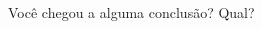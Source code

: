 \documentclass[a4paper,14pt]{article}
\begin{document}
\begin{multicols}{2}
\begin{enumerate}
			Você chegou a alguma conclusão? Qual?
		\end{enumerate}
		$~$ \\ $~$ \\ $~$ \\ $~$ \\ $~$ \\ $~$ \\ $~$ \\ $~$ \\ $~$ \\ $~$ \\ $~$ \\ $~$ \\ $~$ \\ $~$ \\ $~$ \\ $~$ \\ $~$ \\ $~$ \\ $~$ \\ $~$ \\ $~$ \\ $~$ \\ $~$ \\ $~$ \\ $~$ \\ $~$ \\ $~$ \\ $~$ \\ $~$ \\ 
	\end{multicols}
\end{document}
